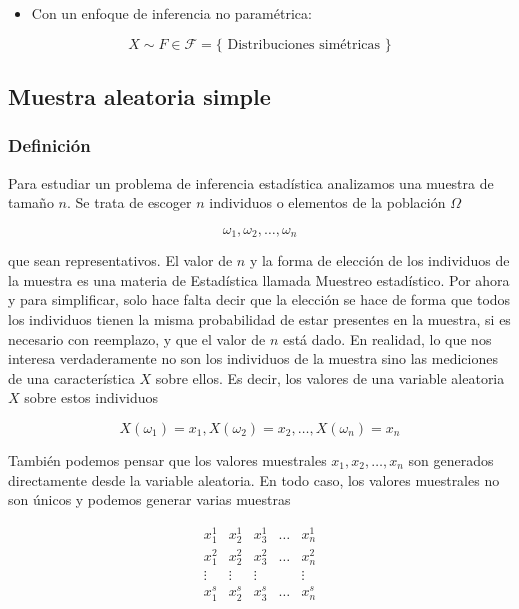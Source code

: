 \documentclass[
]{article}
\providecommand{\tightlist}{%
  \setlength{\itemsep}{0pt}\setlength{\parskip}{0pt}}
\begin{document}
\begin{itemize}
\tightlist
\item
  Con un enfoque de inferencia no paramétrica:
\end{itemize}

\[
X \sim F \in \mathcal{F}=\{\text { Distribuciones simétricas }\}
\]

\subsection{Muestra aleatoria simple}\label{muestra-aleatoria-simple}

\subsubsection{Definición}\label{definiciuxf3n}

Para estudiar un problema de inferencia estadística analizamos una muestra de tamaño \(n\). Se trata de escoger \(n\) individuos o elementos de la población \(\Omega\)

\[
\omega_{1}, \omega_{2}, \ldots, \omega_{n}
\]

que sean representativos. El valor de \(n\) y la forma de elección de los individuos de la muestra es una materia de Estadística llamada Muestreo estadístico. Por ahora y para simplificar, solo hace falta decir que la elección se hace de forma que todos los individuos tienen la misma probabilidad de estar presentes en la muestra, si es necesario con reemplazo, y que el valor de \(n\) está dado.
En realidad, lo que nos interesa verdaderamente no son los individuos de la muestra sino las mediciones de una característica \(X\) sobre ellos. Es decir, los valores de una variable aleatoria \(X\) sobre estos individuos

\[
X\left(\omega_{1}\right)=x_{1}, X\left(\omega_{2}\right)=x_{2}, \ldots, X\left(\omega_{n}\right)=x_{n}
\]

También podemos pensar que los valores muestrales \(x_{1}, x_{2}, \ldots, x_{n}\) son generados directamente desde la variable aleatoria. En todo caso, los valores muestrales no son únicos y podemos generar varias muestras

\[
\begin{array}{ccccc}
x_{1}^{1} & x_{2}^{1} & x_{3}^{1} & \ldots & x_{n}^{1} \\
x_{1}^{2} & x_{2}^{2} & x_{3}^{2} & \ldots & x_{n}^{2} \\
\vdots & \vdots & \vdots & & \vdots \\
x_{1}^{s} & x_{2}^{s} & x_{3}^{s} & \ldots & x_{n}^{s}
\end{array}
\]
\end{document}
